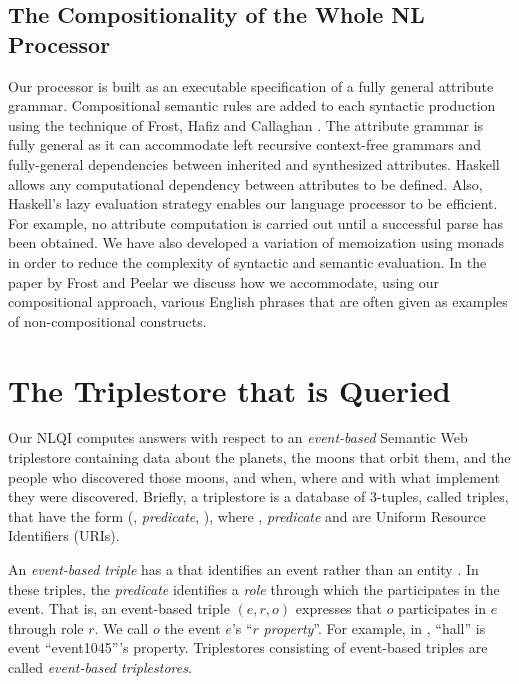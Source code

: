 \documentclass[../main.tex]{subfiles}
\begin{document}
\begin{refsection}
\subsection{The Compositionality of the Whole NL Processor}

Our processor is built as an executable specification of a fully general attribute grammar. Compositional semantic rules are added to each syntactic production using the technique of Frost, Hafiz and Callaghan \cite{frosthafiz2008}. The attribute grammar is fully general as it can accommodate left recursive context-free grammars and fully-general dependencies between inherited and synthesized attributes. Haskell allows any computational dependency between attributes to be defined. Also, Haskell’s lazy evaluation strategy enables our language processor to be efficient. For example, no attribute computation is carried out until a successful parse has been obtained. We have also developed a variation of memoization using monads \cite{frosthafiz2008} in order to reduce the complexity of syntactic and semantic evaluation.
In the paper by Frost and Peelar \cite{frostpeelar2019} we discuss how we accommodate, using our compositional approach, various English phrases that are often given as examples of non-compositional constructs.

\section{The Triplestore that is Queried}
\label{webist2019journal:triplestore}
Our NLQI computes answers with respect to an \textit{event-based} Semantic Web triplestore containing data about the planets, the moons that orbit them, and the people who discovered those moons, and when, where and with what implement they were discovered.  Briefly, a triplestore is a database of 3-tuples, called triples, that have the form (, \textit{predicate}, ), where , \textit{predicate} and  are Uniform Resource Identifiers (URIs).

An \textit{event-based triple} has a  that identifies an event rather than an entity \cite{peelar2016accommodating}. In these triples, the \textit{predicate} identifies a \textit{role} through which the  participates in the event.  That is, an event-based triple $(e,r,o)$ expresses that $o$ participates in $e$ through role $r$.
We call $o$ the event $e$'s ``$r$ \textit{property}''. For example, in , ``hall'' is event ``event1045'''s  property. Triplestores consisting of event-based triples are called \textit{event-based triplestores}.


\end{refsection}
\end{document}
